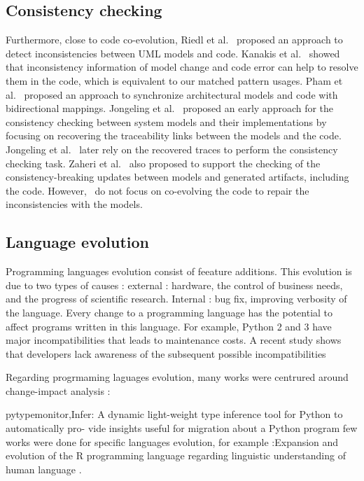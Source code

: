  \subsection{Consistency checking }
 \label{Consistency_checking}
 Furthermore, close to code co-evolution, Riedl et al.~\cite{riedl2014towards} proposed an approach to detect inconsistencies between UML models and code. Kanakis et al.~\cite{kanakis2019empirical} showed that inconsistency information of model change and code error can help to resolve them in the code, which is equivalent to our matched pattern usages. 
 Pham et al.~\cite{pham2017bidirectional} proposed an approach to synchronize architectural models and code with bidirectional mappings.
 Jongeling et al.~\cite{jongeling2020towards} proposed an early approach for the consistency checking between system models and their implementations by focusing on recovering the traceability links between the models and the code. Jongeling et al.~\cite{jongeling2022Structural} later rely on the recovered traces to perform the consistency checking task.  %
 Zaheri et al.~\cite{zaheri2021towards} also proposed to support the checking of the consistency-breaking updates between models and generated artifacts, including the code. However,~\cite{pham2017bidirectional,jongeling2020towards,jongeling2022Structural,zaheri2021towards} do not focus on co-evolving the code to repair the inconsistencies with the models. 
 \subsection{Language evolution}
 Programming languages evolution consist of feeature additions.
 This evolution is due to two types of causes : external : hardware, the control of business needs, and the progress of scientific research. Internal : bug fix, improving verbosity of the language.
 Every change to a programming language has the potential to affect programs written
 in this language. For example, Python 2 and 3 have major incompatibilities that leads to maintenance costs.
 A recent study shows that developers lack awareness of the subsequent possible incompatibilities 
 \cite{dietrich2016java}
 
Regarding progrmaming laguages evolution, many works were centrured around change-impact analysis :
\cite{arnold1996software,ren2004chianti,ryder2001change}


 
 pytypemonitor,Infer: A dynamic light-weight type inference tool for Python to automatically pro- vide insights useful for migration about a Python program \cite{urma2017programming}
 few works were done for specific languages evolution, for example :Expansion and evolution of the R programming language regarding linguistic understanding of human language \cite{urma2017programming}.
 
